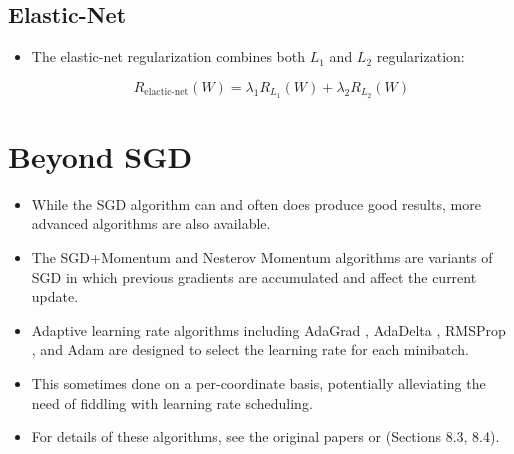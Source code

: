\subsection{Elastic-Net}
\begin{itemize}
  \item  The elastic-net regularization \cite{zou2005regularization} combines both $L_1$ and $L_2$ regularization:
 
 \begin{displaymath}
  R_{\text{elactic-net}}(W) = \lambda_{1}R_{L_{1}}(W) + \lambda_{2}R_{L_{2}}(W)
 \end{displaymath}

  
\end{itemize}




\section{Beyond SGD}
\begin{itemize}
 \item While the SGD algorithm can and often does produce good results, more advanced algorithms are also available. 
 \item The SGD+Momentum \cite{polyak1964some} and Nesterov Momentum \cite{nesterov2018lectures,sutskever2013importance}  algorithms are variants of SGD in which previous gradients are accumulated and affect the current update. 
\item Adaptive learning rate algorithms including AdaGrad \cite{duchi2011adaptive}, AdaDelta \cite{zeiler2012adadelta}, RMSProp \cite{tieleman2012lecture}, and Adam \cite{kingma2014adam} are designed to select the learning rate for each minibatch.
\item This sometimes done on a per-coordinate basis, potentially alleviating the need of fiddling with learning rate scheduling. 
\item For details of these algorithms, see the original papers or \cite{goodfellow2016deep}(Sections 8.3, 8.4).
 
\end{itemize}



